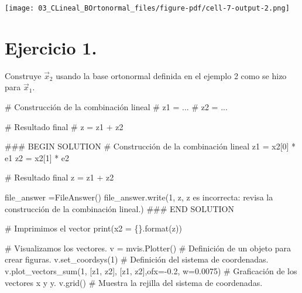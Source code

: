 \documentclass[
  letterpaper,
  DIV=11,
  numbers=noendperiod]{scrreprt}
\newenvironment{Shaded}{\begin{snugshade}}{\end{snugshade}}
\newcommand{\BuiltInTok}[1]{\textcolor[rgb]{0.00,0.23,0.31}{#1}}
\newcommand{\CommentTok}[1]{\textcolor[rgb]{0.37,0.37,0.37}{#1}}
\newcommand{\DecValTok}[1]{\textcolor[rgb]{0.68,0.00,0.00}{#1}}
\newcommand{\FloatTok}[1]{\textcolor[rgb]{0.68,0.00,0.00}{#1}}
\newcommand{\NormalTok}[1]{\textcolor[rgb]{0.00,0.23,0.31}{#1}}
\newcommand{\OperatorTok}[1]{\textcolor[rgb]{0.37,0.37,0.37}{#1}}
\newcommand{\RegionMarkerTok}[1]{\textcolor[rgb]{0.00,0.23,0.31}{#1}}
\newcommand{\SpecialCharTok}[1]{\textcolor[rgb]{0.37,0.37,0.37}{#1}}
\newcommand{\StringTok}[1]{\textcolor[rgb]{0.13,0.47,0.30}{#1}}
\begin{document}
\texttt{[image: 03\_CLineal\_BOrtonormal\_files/figure-pdf/cell-7-output-2.png]}

\section{\texorpdfstring{\textbf{Ejercicio
1.}}{Ejercicio 1.}}\label{ejercicio-1.-2}

Construye \(\vec{x}_2\) usando la base ortonormal definida en el ejemplo
2 como se hizo para \(\vec{x}_1\).

\begin{Shaded}
\begin{Highlighting}[]
\CommentTok{\# Construcción de la combinación lineal}
\CommentTok{\# z1 = ...}
\CommentTok{\# z2 = ...}

\CommentTok{\# Resultado final}
\CommentTok{\# z = z1 + z2}

\CommentTok{\#\#\# }\RegionMarkerTok{BEGIN}\CommentTok{ SOLUTION}
\CommentTok{\# Construcción de la combinación lineal}
\NormalTok{z1 }\OperatorTok{=}\NormalTok{ x2[}\DecValTok{0}\NormalTok{] }\OperatorTok{*}\NormalTok{ e1}
\NormalTok{z2 }\OperatorTok{=}\NormalTok{ x2[}\DecValTok{1}\NormalTok{] }\OperatorTok{*}\NormalTok{ e2}

\CommentTok{\# Resultado final}
\NormalTok{z }\OperatorTok{=}\NormalTok{ z1 }\OperatorTok{+}\NormalTok{ z2}

\NormalTok{file\_answer }\OperatorTok{=}\NormalTok{FileAnswer()}
\NormalTok{file\_answer.write(}\StringTok{\textquotesingle{}1\textquotesingle{}}\NormalTok{, z, }\StringTok{\textquotesingle{}z es incorrecta: revisa la construcción de la combinación lineal.\textquotesingle{}}\NormalTok{)}
\CommentTok{\#\#\# }\RegionMarkerTok{END}\CommentTok{ SOLUTION}

\CommentTok{\# Imprimimos el vector}
\BuiltInTok{print}\NormalTok{(}\StringTok{\textquotesingle{}x2 = }\SpecialCharTok{\{\}}\StringTok{\textquotesingle{}}\NormalTok{.}\BuiltInTok{format}\NormalTok{(z))}

\CommentTok{\# Visualizamos los vectores.}
\NormalTok{v }\OperatorTok{=}\NormalTok{ mvis.Plotter()  }\CommentTok{\# Definición de un objeto para crear figuras.}
\NormalTok{v.set\_coordsys(}\DecValTok{1}\NormalTok{)   }\CommentTok{\# Definición del sistema de coordenadas.}
\NormalTok{v.plot\_vectors\_sum(}\DecValTok{1}\NormalTok{, [z1, z2], [}\StringTok{\textquotesingle{}z1\textquotesingle{}}\NormalTok{, }\StringTok{\textquotesingle{}z2\textquotesingle{}}\NormalTok{],ofx}\OperatorTok{={-}}\FloatTok{0.2}\NormalTok{, w}\OperatorTok{=}\FloatTok{0.0075}\NormalTok{) }\CommentTok{\# Graficación de los vectores \textquotesingle{}x\textquotesingle{} y \textquotesingle{}y\textquotesingle{}.}
\NormalTok{v.grid()  }\CommentTok{\# Muestra la rejilla del sistema de coordenadas.}
\end{Highlighting}
\end{Shaded}
\end{document}
